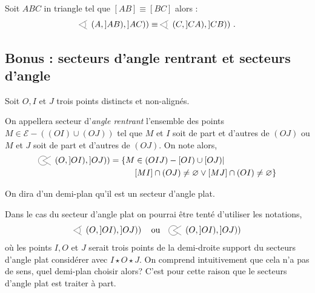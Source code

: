 \begin{prop}\label{prop-isocelecongruenceangle}
    Soit $ABC$ in triangle tel que $[AB]\equiv [BC]$ alors : $$\anglesaillant \left(A,]AB),]AC)\right)\equiv\anglesaillant \left(C,]CA),]CB)\right)\,.$$
\end{prop}

        \subsection{Bonus : secteurs d'angle rentrant et secteurs d'angle}

\begin{defi}\label{defi-anglerentrant}
    Soit $O,I$ et $J$ trois points distincts et non-alignés.
    
    On appellera secteur d'\emph{angle rentrant} l'ensemble des points $M\in \mathcal{E}-((OI)\cup(OJ))$ tel que $M$ et $I$ soit de part et d'autres de $(OJ)$ ou $M$ et $J$ soit de part et d'autres de $(OJ)$. On note alors,
    \begin{align*}
        \anglerentrant \left({O},{]OI)},{]OJ)}\right) =  \{M & \in (OIJ)-[OI)\cup[OJ)|  \\
        & [MI] \cap (OJ)\neq \varnothing \lor [MJ] \cap (OI)\neq \varnothing\}
    \end{align*}
\end{defi}

\begin{defi}
    On dira d'un demi-plan qu'il est un secteur d'angle plat.  
\end{defi}

\begin{rema}
 Dans le cas du secteur d'angle plat on pourrai être tenté d'utiliser les notations,
 \begin{equation*}
      \anglesaillant\left({O},{]OI)},{]OJ)}\right) \quad \text{ou} \quad \anglerentrant\left({O},{]OI)},{]OJ)}\right)
 \end{equation*}
 où les points $I,O$ et $J$ serait trois points de la demi-droite support du secteurs d'angle plat considérer avec $I\star O\star J$. On comprend intuitivement que cela n'a pas de sens, quel demi-plan choisir alors? C'est pour cette raison que le secteurs d'angle plat est traiter à part.
\end{rema}

